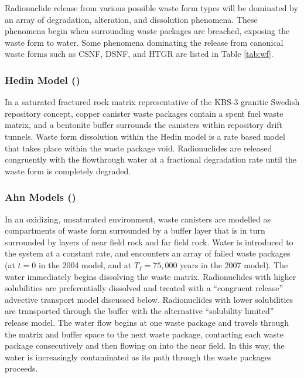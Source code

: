 Radionuclide release from various possible waste form types will be dominated by an 
array of degradation, alteration, and dissolution phenomena. These phenomena 
begin when surrounding waste packages are breached, exposing the waste form to 
water. Some phenomena dominating the release from canonical waste forms such as  
\gls{CSNF}, \gls{DSNF}, and \gls{HTGR} are listed in Table \ref{tab:wf}.








\subsubsection{Hedin Model (\cite{hedin_integrated_2002})}

In a saturated fractured rock matrix representative of the KBS-3 granitic
Swedish repository concept, copper canister waste packages contain a spent fuel
waste matrix, and a bentonite buffer surrounds the canisters within repository 
drift tunnels. Waste form dissolution within the Hedin model is a rate based
model that takes place within the waste package void. Radionuclides are 
released congruently with the flowthrough water at a fractional degradation 
rate until the waste form is completely degraded.
\cite{hedin_integrated_2002} 

\subsubsection{Ahn Models (\cite{ahn_environmental_2004,
ahn_environmental_2007})}

In an oxidizing, unsaturated environment, waste canisters are modelled as 
compartments of waste form surrounded by a buffer layer that is in turn 
surrounded by layers of near field rock and far field rock. Water is introduced 
to the system at a constant rate, and encounters an array of failed waste 
packages (at $t=0$ in the 2004 model, and at $T_f=75,000$ years in the 2007 model). 
The water immediately begins dissolving the waste matrix.  Radionuclides with higher 
solubilities are preferentially dissolved and treated with a ``congruent 
release'' advective transport model discussed
below. Radionuclides with lower solubilities are transported through the buffer with
the alternative ``solubility limited'' release model. The water flow begins at
one waste package and travels through the matrix and buffer space to the next
waste package, contacting each waste package consecutively and then flowing on
into the near field. In this way, the water is increasingly contaminated as its
path through the waste packages proceeds.  

